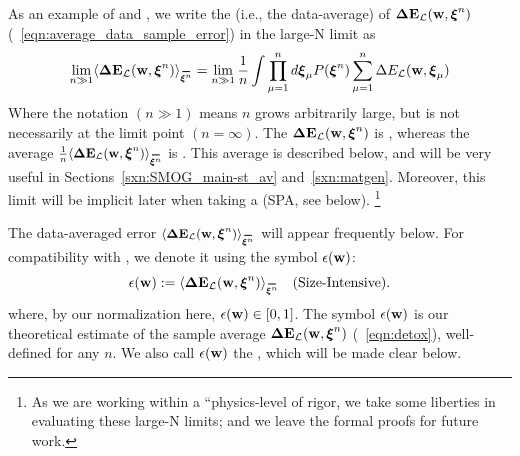 As an example of \SizeExtensivity and \SizeIntensivity, 
we write the \ExpectedValue (i.e., the data-average) of \DataSampleError $\mathbf{\Delta {E}}_{\mathcal{L}}(\mathbf{w}, \boldsymbol{\xi}^{n})$ (\EQN~\ref{eqn:average_data_sample_error})
in the large-N limit as
\begin{align}
  \lim_{n\gg 1} 
  \langle \DETOPXI\rangle_{\AVGNDXIn}=
  \lim_{n\gg 1}\frac{1}{n}
\int \prod_{\mu=1}^{n}d\XI_{\mu}P(\NDXIn)
  \sum_{\mu=1}^{n}\Delta E_{\mathcal{L}}(\WVEC,\XI_{\mu})
\end{align}
Where the notation $(n \gg 1)$ means $n$ grows arbitrarily large, but is not necessarily
at the limit point $(n=\infty)$.
The \TotalDataSampleError $\mathbf{\Delta {E}}_{\mathcal{L}}(\mathbf{w}, \boldsymbol{\xi}^{n})$ is \SizeExtensive, whereas the
average $\frac{1}{n}\langle\DETOPXI\rangle_{\AVGNDXIn}$ is \SizeIntensive.
This average is described below, and will be very useful in Sections~\ref{sxn:SMOG_main-st_av}
and~\ref{sxn:matgen}.
Moreover, this limit will be implicit later when taking a \SaddlePointApproximation (SPA, see below).
\footnote{As we are working within a ``physics-level of rigor, we take some liberties in evaluating these large-N limits; and we leave the formal proofs for future work.  }

The data-averaged error  $\langle \DETOPXI \rangle_{\AVGNDXIn}$ will appear frequently below.
For compatibility with \cite{SST92}, we denote it using the symbol $\epsilon({\mathbf{w}})$:
\begin{align}
 \label{eqn:epsl}
 \EPSLw:=\langle \DETOPXI \rangle_{\AVGNDXIn} \quad \text{(\SizeIntensive)}.
\end{align}
where, by our normalization here, $\epsilon({\mathbf{w}}) \in [0,1]$.
The symbol $\epsilon({\mathbf{w}})$ is our theoretical estimate of the sample average $\mathbf{\Delta {E}}_{\mathcal{L}}(\mathbf{w}, \boldsymbol{\xi}^{n})$ (\EQN~\ref{eqn:detox}),
well-defined for any $n$.
We also call $\epsilon({\mathbf{w}})$ the \emph{\EffectivePotential}, which will be made clear below.


